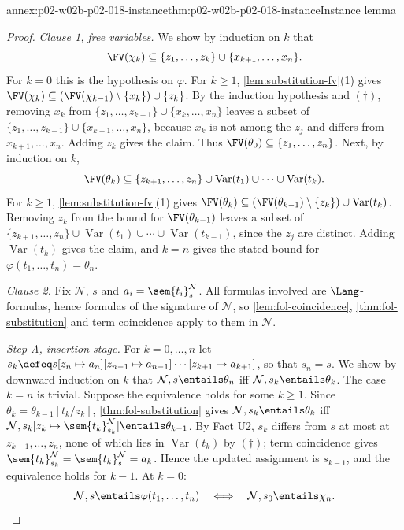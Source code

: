 \begin{annexitem}{annex:p02-w02b-p02-018-instance}{thm:p02-w02b-p02-018-instance}{Instance lemma}
\begin{proof}
\emph{Clause 1, free variables.}  We show by induction on \(k\) that
\[
 \FV(\chi_k)\subseteq\{z_1,\ldots,z_k\}\cup\{x_{k+1},\ldots,x_n\}.
\]
For \(k=0\) this is the hypothesis on \(\varphi\).  For \(k\geq1\),
\cref{lem:substitution-fv}(1) gives
\(\FV(\chi_k)\subseteq(\FV(\chi_{k-1})\setminus\{x_k\})\cup\{z_k\}\).
By the induction hypothesis and \((\dagger)\), removing \(x_k\) from
\(\{z_1,\ldots,z_{k-1}\}\cup\{x_k,\ldots,x_n\}\) leaves a subset of
\(\{z_1,\ldots,z_{k-1}\}\cup\{x_{k+1},\ldots,x_n\}\), because \(x_k\) is not
among the \(z_j\) and differs from \(x_{k+1},\ldots,x_n\).  Adding \(z_k\)
gives the claim.  Thus \(\FV(\theta_0)\subseteq\{z_1,\ldots,z_n\}\).  Next,
by induction on \(k\),
\[
 \FV(\theta_k)\subseteq\{z_{k+1},\ldots,z_n\}
 \cup\operatorname{Var}(t_1)\cup\cdots\cup\operatorname{Var}(t_k).
\]
For \(k\geq1\), \cref{lem:substitution-fv}(1) gives
\(\FV(\theta_k)\subseteq(\FV(\theta_{k-1})\setminus\{z_k\})
\cup\operatorname{Var}(t_k)\).  Removing \(z_k\) from the bound for
\(\FV(\theta_{k-1})\) leaves a subset of
\(\{z_{k+1},\ldots,z_n\}\cup\operatorname{Var}(t_1)\cup\cdots
\cup\operatorname{Var}(t_{k-1})\), since the \(z_j\) are distinct.  Adding
\(\operatorname{Var}(t_k)\) gives the claim, and \(k=n\) gives the stated
bound for \(\varphi(t_1,\ldots,t_n)=\theta_n\).

\emph{Clause 2.}  Fix \(\mathcal N\), \(s\) and
\(a_i=\sem{t_i}^{\mathcal N}_s\).  All formulas involved are
\(\Lang\)-formulas, hence formulas of the signature of \(\mathcal N\), so
\cref{lem:fol-coincidence}, \cref{thm:fol-substitution} and term coincidence
apply to them in \(\mathcal N\).

\emph{Step A, insertion stage.}  For \(k=0,\ldots,n\) let
\(s_k\defeq s[z_n\mapsto a_n][z_{n-1}\mapsto a_{n-1}]\cdots
[z_{k+1}\mapsto a_{k+1}]\), so that \(s_n=s\).  We show by downward
induction on \(k\) that
\(\mathcal N,s\entails\theta_n\) iff \(\mathcal N,s_k\entails\theta_k\).
The case \(k=n\) is trivial.  Suppose the equivalence holds for some
\(k\geq1\).  Since \(\theta_k=\theta_{k-1}[t_k/z_k]\),
\cref{thm:fol-substitution} gives
\(\mathcal N,s_k\entails\theta_k\) iff
\(\mathcal N,s_k[z_k\mapsto\sem{t_k}^{\mathcal N}_{s_k}]\entails
\theta_{k-1}\).  By Fact U2, \(s_k\) differs from \(s\) at most at
\(z_{k+1},\ldots,z_n\), none of which lies in \(\operatorname{Var}(t_k)\) by
\((\dagger)\); term coincidence gives
\(\sem{t_k}^{\mathcal N}_{s_k}=\sem{t_k}^{\mathcal N}_s=a_k\).  Hence the
updated assignment is \(s_{k-1}\), and the equivalence holds for \(k-1\).
At \(k=0\):
\[
 \mathcal N,s\entails\varphi(t_1,\ldots,t_n)
 \quad\Longleftrightarrow\quad
 \mathcal N,s_0\entails\chi_n .
\]


\end{proof}
\end{annexitem}
